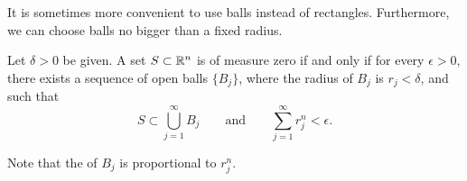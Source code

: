 It is sometimes more convenient to use balls instead of rectangles.
Furthermore, we can
choose balls no bigger than a fixed radius.

\begin{prop} \label{mv:prop:ballsnull}
Let $\delta > 0$ be given.
A set $S \subset {\mathbb{R}}^n$ is of measure zero if and only if for every $\epsilon >
0$, there exists a sequence of open balls $\{ B_j \}$, where the radius of
$B_j$ is $r_j < \delta$, and such that
\begin{equation*}
S \subset \bigcup_{j=1}^\infty B_j \qquad \text{and} \qquad
\sum_{j=1}^\infty r_j^n < \epsilon.
\end{equation*}
\end{prop}

Note that the  of $B_j$ is proportional to $r_j^n$.

